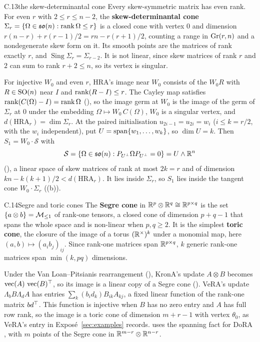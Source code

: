 \begin{bgentry}{C.13}{the skew-determinantal cone}
Every skew-symmetric matrix has even rank. For even $r$ with $2\le r\le n-2$, the \textbf{skew-determinantal cone}
$\Sigma_r=\{\Omega\in\mathfrak{so}(n):\operatorname{rank}\Omega\le r\}$ is a closed cone with vertex $0$ and dimension
$r(n-r)+r(r-1)/2=rn-r(r+1)/2$, counting a range in $\operatorname{Gr}(r,n)$ and a nondegenerate skew form on it. Its smooth points are
the matrices of rank exactly $r$, and $\operatorname{Sing}\Sigma_r=\Sigma_{r-2}$. It is not linear, since skew matrices
of rank $r$ and $2$ can sum to rank $r+2\le n$, so its vertex is singular.
\end{bgentry}

For injective $W_0$ and even $r$, HRA's image near $W_0$ consists of the $W_0R$ with $R\in\mathrm{SO}(n)$ near $I$ and
$\operatorname{rank}(R-I)\le r$. The Cayley map satisfies $\operatorname{rank}(C(\Omega)-I)=\operatorname{rank}\Omega$ (), so the image germ at $W_0$ is the
image of the germ of $\Sigma_r$ at $0$ under the embedding $\Omega\mapsto W_0\,C(\Omega)$, $W_0$ is a singular vertex,
and $d(\mathrm{HRA}_r)=\dim\Sigma_r$. At the paired initialisation $u_{2i-1}=u_{2i}=w_i$ ($i\le k=r/2$, with the $w_i$
independent), put $U=\operatorname{span}\{w_1,\dots,w_k\}$, so $\dim U=k$. Then $S_1=W_0\cdot\mathcal S$ with
\[\mathcal S=\{\Omega\in\mathfrak{so}(n):P_{U^\perp}\Omega P_{U^\perp}=0\}=U\wedge\mathbb{R}^n\]
(), a linear space of skew matrices of rank at most $2k=r$ and of dimension $kn-k(k+1)/2<d(\mathrm{HRA}_r)$.
It lies inside $\Sigma_r$, so $S_1$ lies inside the tangent cone $W_0\cdot\Sigma_r$ ((b)).


\begin{bgentry}{C.14}{Segre and toric cones}
The \textbf{Segre cone} in $\mathbb{R}^p\otimes\mathbb{R}^q\cong\mathbb{R}^{p\times q}$ is the set $\{a\otimes b\}=\mathcal{M}_{\le1}$ of rank-one
tensors, a closed cone of dimension $p+q-1$ that spans the whole space and is non-linear when $p,q\ge2$. It is the
simplest \textbf{toric cone}, the closure of the image of a torus $(\mathbb{R}^\times)^k$ under a monomial map, here
$(a,b)\mapsto(a_ib_j)_{ij}$. Since rank-one matrices span $\mathbb{R}^{p\times q}$, $k$ generic rank-one matrices span
$\min(k,pq)$ dimensions.
\end{bgentry}

Under the Van Loan--Pitsianis rearrangement (), KronA's \citep{edalati2022krona} update $A\otimes B$ becomes
$\operatorname{vec}(A)\,\operatorname{vec}(B)^{\top}$, so its image is a linear copy of a Segre cone (). VeRA's
\citep{kopiczko2023vera} update $\Lambda_bB\Lambda_dA$ has entries $\sum_k(b_id_k)B_{ik}A_{kj}$, a fixed linear function
of the rank-one matrix $bd^{\top}$. This function is injective when $B$ has no zero entry and $A$ has full row rank, so the
image is a toric cone of dimension $m+r-1$ with vertex $\theta_0$, as VeRA's entry in Exposé~\ref{sec:examples} records.
 uses the spanning fact for DoRA \citep{liu2024dora}, with $m$ points of the Segre cone in
$\mathbb{R}^{m-r}\otimes\mathbb{R}^{n-r}$.


